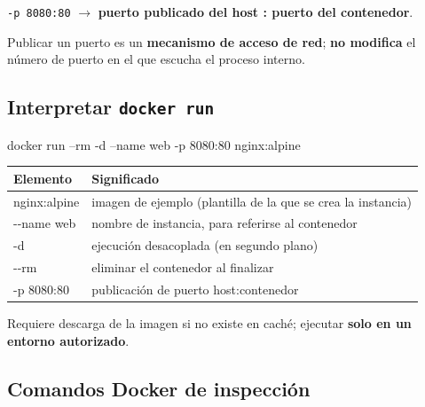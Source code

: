 \documentclass[11pt,a4paper]{article}
\newcommand{\cmd}[1]{\texttt{#1}}
\begin{document}
\begin{defbox}
\cmd{-p 8080:80} $\rightarrow$ \textbf{puerto publicado del host : puerto del contenedor}.
\end{defbox}

\begin{errorbox}
Publicar un puerto es un \textbf{mecanismo de acceso de red}; \textbf{no modifica} el número
de puerto en el que escucha el proceso interno.
\end{errorbox}

\subsection{Interpretar \texttt{docker run}}

\begin{codigo}
docker run --rm -d --name web -p 8080:80 nginx:alpine
\end{codigo}

\begin{center}
\renewcommand{\arraystretch}{1.3}
\begin{tabularx}{\textwidth}{@{}>{\ttfamily}l >{\raggedright\arraybackslash}X@{}}
\toprule
\textbf{\normalfont\color{azulprof} Elemento} & \textbf{\color{azulprof} Significado} \\
\midrule
nginx:alpine & imagen de ejemplo (plantilla de la que se crea la instancia) \\
-{}-name web & nombre de instancia, para referirse al contenedor \\
-d           & ejecución desacoplada (en segundo plano) \\
-{}-rm       & eliminar el contenedor al finalizar \\
-p 8080:80   & publicación de puerto host:contenedor \\
\bottomrule
\end{tabularx}
\end{center}

\begin{aviso}
Requiere descarga de la imagen si no existe en caché; ejecutar \textbf{solo en un entorno
autorizado}.
\end{aviso}

\subsection{Comandos Docker de inspección}
\end{document}
